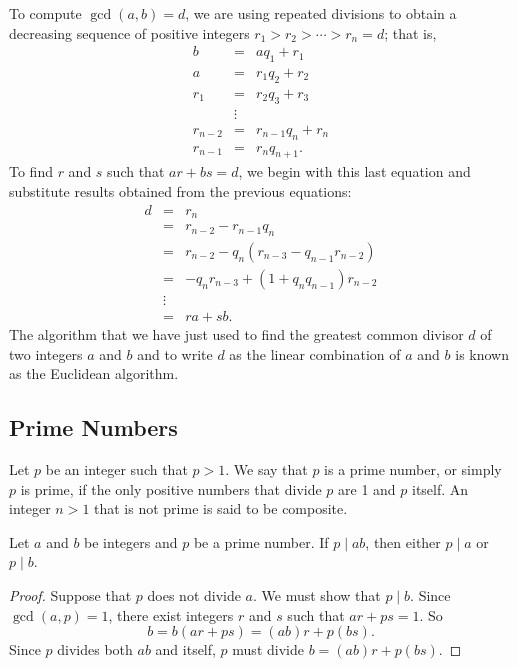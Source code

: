 To compute $\gcd(a,b) = d$, we are using repeated divisions to obtain a decreasing sequence of positive integers $r_1 > r_2 > \cdots > r_n = d$; that is,
\begin{eqnarray*}
b & = & a q_1 + r_1 \\
a & = & r_1 q_2 + r_2 \\
r_1 & = & r_2 q_3 + r_3 \\
& \vdots & \\
r_{n - 2} & = & r_{n - 1} q_{n} + r_{n} \\
r_{n - 1} & = & r_n q_{n + 1}.
\end{eqnarray*}
To find $r$ and $s$ such that $ar + bs = d$, we begin with this last equation and substitute results obtained from the previous equations:
\begin{eqnarray*}
d & = & r_n \\
& = & r_{n - 2} - r_{n - 1} q_n \\
& = & r_{n - 2} - q_n( r_{n - 3} - q_{n - 1} r_{n - 2} ) \\
& = & -q_n r_{n - 3} + ( 1+ q_n q_{n-1} ) r_{n - 2}  \\
& \vdots & \\
& = & ra + sb.
\end{eqnarray*}
The algorithm that we have just used to find the greatest common divisor $d$ of two integers $a$ and $b$ and to write $d$ as the linear combination of $a$ and $b$ is known as the {\bfi Euclidean algorithm}.  
 
 
\subsection*{Prime Numbers}

Let $p$ be an integer such that $p > 1$.  We say that $p$ is a {\bfi prime number}, or simply $p$ is {\bfi prime}, if the only positive numbers that divide $p$ are 1 and $p$ itself.  An integer $n > 1$ that is not prime is said to be {\bfi composite}.  

\begin{lemma}[Euclid]\label{integers_theorem_prime_divide}
Let $a$ and $b$ be integers and $p$ be a prime number.  If $p \mid ab$, then either $p \mid a$ or $p \mid b$. 
\end{lemma}

\begin{proof}
Suppose that $p$ does not divide $a$.  We must show that $p \mid b$. Since $\gcd( a, p ) = 1$, there exist integers $r$ and $s$ such that $ar + ps = 1$.  So 
$$
b = b(ar + ps) = (ab)r + p(bs).
$$
Since $p$ divides both $ab$ and itself, $p$ must divide $b = (ab)r + p(bs)$. 
\end{proof}

